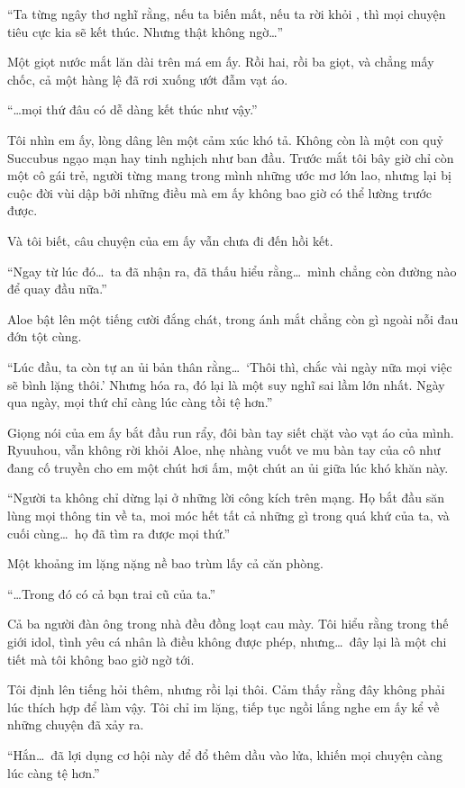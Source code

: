 \documentclass[../main.tex]{subfiles}
\begin{document}
``Ta từng ngây thơ nghĩ rằng, nếu ta biến mất, nếu ta rời khỏi \hll, thì mọi chuyện tiêu cực kia sẽ kết thúc. Nhưng thật không ngờ\dots''

Một giọt nước mắt lăn dài trên má em ấy. Rồi hai, rồi ba giọt, và chẳng mấy chốc, cả một hàng lệ đã rơi xuống ướt đẫm vạt áo.

``\dots mọi thứ đâu có dễ dàng kết thúc như vậy.''

Tôi nhìn em ấy, lòng dâng lên một cảm xúc khó tả. Không còn là một con quỷ Succubus ngạo mạn hay tinh nghịch như ban đầu. Trước mắt tôi bây giờ chỉ còn một cô gái trẻ, người từng mang trong mình những ước mơ lớn lao, nhưng lại bị cuộc đời vùi dập bởi những điều mà em ấy không bao giờ có thể lường trước được.

Và tôi biết, câu chuyện của em ấy vẫn chưa đi đến hồi kết.

``Ngay từ lúc đó\dots\ ta đã nhận ra, đã thấu hiểu rằng\dots\ mình chẳng còn đường nào để quay đầu nữa.''

Aloe bật lên một tiếng cười đắng chát, trong ánh mắt chẳng còn gì ngoài nỗi đau đớn tột cùng.

``Lúc đầu, ta còn tự an ủi bản thân rằng\dots\ `Thôi thì, chắc vài ngày nữa mọi việc sẽ bình lặng thôi.' Nhưng hóa ra, đó lại là một suy nghĩ sai lầm lớn nhất. Ngày qua ngày, mọi thứ chỉ càng lúc càng tồi tệ hơn.''

Giọng nói của em ấy bắt đầu run rẩy, đôi bàn tay siết chặt vào vạt áo của mình. Ryuuhou, vẫn không rời khỏi Aloe, nhẹ nhàng vuốt ve mu bàn tay của cô như đang cố truyền cho em một chút hơi ấm, một chút an ủi giữa lúc khó khăn này.

``Người ta không chỉ dừng lại ở những lời công kích trên mạng. Họ bắt đầu săn lùng mọi thông tin về ta, moi móc hết tất cả những gì trong quá khứ của ta, và cuối cùng\dots\ họ đã tìm ra được mọi thứ.''

Một khoảng im lặng nặng nề bao trùm lấy cả căn phòng.

``\dots Trong đó có cả bạn trai cũ của ta.''

Cả ba người đàn ông trong nhà đều đồng loạt cau mày. Tôi hiểu rằng trong thế giới idol, tình yêu cá nhân là điều không được phép, nhưng\dots\ đây lại là một chi tiết mà tôi không bao giờ ngờ tới.

Tôi định lên tiếng hỏi thêm, nhưng rồi lại thôi. Cảm thấy rằng đây không phải lúc thích hợp để làm vậy. Tôi chỉ im lặng, tiếp tục ngồi lắng nghe em ấy kể về những chuyện đã xảy ra.

``Hắn\dots\ đã lợi dụng cơ hội này để đổ thêm dầu vào lửa, khiến mọi chuyện càng lúc càng tệ hơn.''
\end{document}
